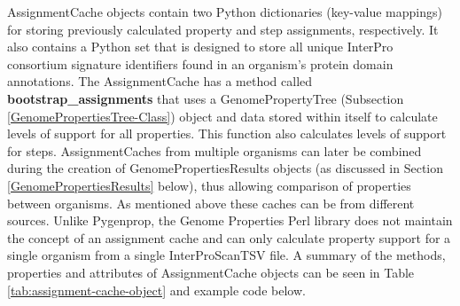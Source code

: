 AssignmentCache objects contain two Python dictionaries (key-value mappings) for storing previously calculated property and step assignments, respectively. It also contains a Python set that is designed to store all unique InterPro consortium signature identifiers found in an organism's protein domain annotations. The AssignmentCache has a method called \textbf{bootstrap\_assignments} that uses a GenomePropertyTree (Subsection \ref{GenomePropertiesTree-Class}) object and data stored within itself to calculate levels of support for all properties. This function also calculates levels of support for steps. AssignmentCaches from multiple organisms can later be combined during the creation of GenomePropertiesResults objects (as discussed in Section \ref{GenomePropertiesResults} below), thus allowing comparison of properties between organisms. As mentioned above these caches can be from different sources. Unlike Pygenprop, the Genome Properties Perl library does not maintain the concept of an assignment cache and can only calculate property support for a single organism from a single InterProScanTSV file. A summary of the methods, properties and attributes of AssignmentCache objects can be seen in Table \ref{tab:assignment-cache-object} and example code below.

